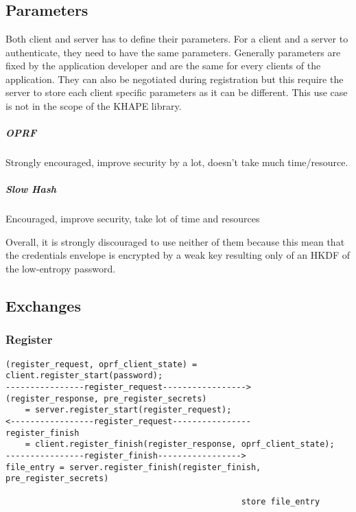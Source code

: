 \documentclass[../report.tex]{subfiles}
\begin{document}
\chapter{}


\section{Parameters}
Both client and server has to define their parameters. For a client and a server to authenticate, they need to have the same parameters. 
Generally parameters are fixed by the application developer and are the same for every clients of the application.
They can also be negotiated during registration but this require the server to store each client specific parameters as it can be different. This use case is not in the scope of the KHAPE library.

\paragraph{OPRF}
Strongly encouraged, improve security by a lot, doesn't take much time/resource.
\paragraph{Slow Hash}
Encouraged, improve security, take lot of time and resources

Overall, it is strongly discouraged to use neither of them because this mean that the credentials envelope is encrypted by a weak key resulting only of an HKDF of the low-entropy password.


\section{Exchanges}

\subsection{Register}
\begin{verbatim}
(register_request, oprf_client_state) = client.register_start(password);
----------------register_request----------------->
(register_response, pre_register_secrets) 
    = server.register_start(register_request);
<-----------------register_request----------------
register_finish
    = client.register_finish(register_response, oprf_client_state);
----------------register_finish----------------->
file_entry = server.register_finish(register_finish, pre_register_secrets)

                                                store file_entry
\end{verbatim}
\end{document}
